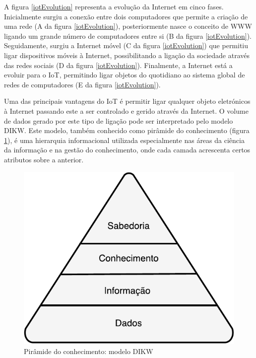 A figura \ref{iotEvolution} representa a evolução da Internet em cinco fases. Inicialmente surgiu a conexão entre dois computadores que permite a criação de uma rede (A da figura \ref{iotEvolution}), posteriormente nasce o conceito de \ac{WWW} ligando um grande número de computadores entre si (B da figura \ref{iotEvolution}). Seguidamente, surgiu a Internet móvel (C da figura \ref{iotEvolution}) que permitiu ligar dispositivos móveis à Internet, possibilitando a ligação da sociedade através das redes sociais (D da figura \ref{iotEvolution}).
Finalmente, a Internet está a evoluir para o \ac{IoT}, permitindo ligar objetos do quotidiano ao sistema global de redes de computadores (E da figura \ref{iotEvolution})\cite{Our2013}.









Uma das principais vantagens do \ac{IoT} é permitir ligar qualquer objeto eletrónicos à Internet passando este a ser controlado e gerido através da Internet. O volume de dados gerado por este tipo de ligação pode ser interpretado pelo modelo \ac{DIKW}\cite{Rowley2007}. Este modelo, também conhecido como pirâmide do conhecimento (figura \ref{dikw1}), é uma hierarquia informacional utilizada especialmente nas áreas da ciência da informação e na gestão do conhecimento, onde cada camada acrescenta certos atributos sobre a anterior.


\begin{figure}[!htb]
	\centering
	\includegraphics[scale=0.8]{img/cap3-iot/dikw.pdf}
	\caption{Pirâmide do conhecimento: modelo DIKW}
	\label{dikw1}
\end{figure}



